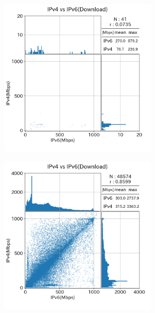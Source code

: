 \begin{figure}[htbp]
\begin{center}
\begin{minipage}[t]{0.48\textwidth}
\begin{center}
\begin{subfigure}[b]{\textwidth}
                    \label{old_CATV_dl}
                \end{subfigure}
                \begin{subfigure}[b]{\textwidth}
                    \centering
                    \includegraphics[width=0.85\textwidth]{fig/old_Mobile_dl.png}
                    \label{old_Mobile_dl}
                \end{subfigure}
            \caption{(1)のダウンロードのスループット}
            \label{fig:old_Line_dl}
            \end{center}
        \end{minipage}
        \hfill
        \begin{minipage}[t]{0.48\textwidth}
            \begin{subfigure}[b]{\textwidth}
                \centering
                \includegraphics[width=0.85\textwidth]{fig/new_FTTH_dl.png}

\end{subfigure}
\end{minipage}
\end{center}
\end{figure}
